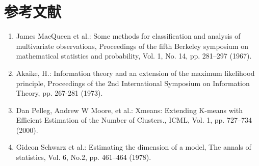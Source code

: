 \section*{参考文献}
\begin{enumerate}
\renewcommand{\labelenumi}{\arabic{enumi})}
  \item James MacQueen et al.:
    Some methods for classification and analysis of multivariate observations,
    Proceedings of the fifth Berkeley symposium on mathematical statistics and probability,
    Vol. 1, No. 14, pp. 281--297 (1967).
  \item Akaike, H.: 
    Information theory and an extension of the maximum likelihood principle, 
    Proceedings of the 2nd International Symposium on Information Theory, 
    pp. 267-281 (1973).
  \item Dan Pelleg, Andrew W Moore, et al.:
    Xmeans: Extending K-means with Efficient Estimation of the Number of Clusters.,
    ICML, Vol. 1, pp. 727--734 (2000).
  \item Gideon Schwarz et al.:
    Estimating the dimension of a model,
    The annals of statistics, Vol. 6, No.2, pp. 461--464 (1978).
\end{enumerate}

